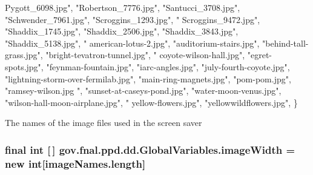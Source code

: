 \begin{DoxyCode}
{      Pygott\_6098.jpg"},
            \textcolor{stringliteral}{"Robertson\_7776.jpg"}, \textcolor{stringliteral}{"Santucci\_3708.jpg"}, \textcolor{stringliteral}{"Schwender\_7961.jpg"}, \textcolor{stringliteral}{"Scroggins\_1293.jpg"}, \textcolor{stringliteral}{"
      Scroggins\_9472.jpg"},
            \textcolor{stringliteral}{"Shaddix\_1745.jpg"}, \textcolor{stringliteral}{"Shaddix\_2506.jpg"}, \textcolor{stringliteral}{"Shaddix\_3843.jpg"}, \textcolor{stringliteral}{"Shaddix\_5138.jpg"}, \textcolor{stringliteral}{"
      american-lotus-2.jpg"},
            \textcolor{stringliteral}{"auditorium-stairs.jpg"}, \textcolor{stringliteral}{"behind-tall-grass.jpg"}, \textcolor{stringliteral}{"bright-tevatron-tunnel.jpg"}, \textcolor{stringliteral}{"
      coyote-wilson-hall.jpg"},
            \textcolor{stringliteral}{"egret-spots.jpg"}, \textcolor{stringliteral}{"feynman-fountain.jpg"}, \textcolor{stringliteral}{"iarc-angles.jpg"}, \textcolor{stringliteral}{"july-fourth-coyote.jpg"},
            \textcolor{stringliteral}{"lightning-storm-over-fermilab.jpg"}, \textcolor{stringliteral}{"main-ring-magnets.jpg"}, \textcolor{stringliteral}{"pom-pom.jpg"}, \textcolor{stringliteral}{"ramsey-wilson.jpg
      "},
            \textcolor{stringliteral}{"sunset-at-caseys-pond.jpg"}, \textcolor{stringliteral}{"water-moon-venus.jpg"}, \textcolor{stringliteral}{"wilson-hall-moon-airplane.jpg"}, \textcolor{stringliteral}{"
      yellow-flowers.jpg"},
            \textcolor{stringliteral}{"yellowwildflowers.jpg"}, \}
\end{DoxyCode}
The names of the image files used in the screen saver \hypertarget{classgov_1_1fnal_1_1ppd_1_1dd_1_1GlobalVariables_a88625f4c1de90b1b1bb20c05fd993617}{
\subsubsection[{image\-Width}]{\setlength{\rightskip}{0pt plus 5cm}final int \mbox{[}$\,$\mbox{]} gov.\-fnal.\-ppd.\-dd.\-Global\-Variables.\-image\-Width = new int\mbox{[}image\-Names.\-length\mbox{]}\hspace{0.3cm}{\ttfamily [static]}}}\label{classgov_1_1fnal_1_1ppd_1_1dd_1_1GlobalVariables_a88625f4c1de90b1b1bb20c05fd993617}
